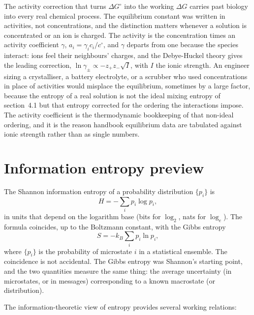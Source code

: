 The activity correction that turns $\Delta G^\circ$ into the working $\Delta G$
carries past biology into every real chemical process. The equilibrium constant
was written in activities, not concentrations, and the distinction matters
whenever a solution is concentrated or an ion is charged. The activity is the
concentration times an activity coefficient $\gamma$, $a_i = \gamma_i c_i/c^\circ$,
and $\gamma$ departs from one because the species interact: ions feel their
neighbours' charges, and the Debye-Huckel theory gives the leading correction,
$\ln\gamma_\pm \propto -z_+ z_- \sqrt{I}$, with $I$ the ionic strength. An
engineer sizing a crystalliser, a battery electrolyte, or a scrubber who used
concentrations in place of activities would misplace the equilibrium, sometimes
by a large factor, because the entropy of a real solution is not the ideal
mixing entropy of section~4.1 but that entropy corrected for the ordering the
interactions impose. The activity coefficient is the thermodynamic bookkeeping of
that non-ideal ordering, and it is the reason handbook equilibrium data are
tabulated against ionic strength rather than as single numbers.

\section{Information entropy preview}

The Shannon information entropy of a probability distribution $\{p_i\}$
is \cite{paper:shannon1948}
\[
H = -\sum_i p_i \log p_i,
\]
in units that depend on the logarithm base (bits for $\log_2$, nats
for $\log_e$). The formula coincides, up to the Boltzmann constant,
with the Gibbs entropy
\[
S = -k_B \sum_i p_i \ln p_i,
\]
where $\{p_i\}$ is the probability of microstate $i$ in a
statistical ensemble. The coincidence is not accidental. The Gibbs
entropy was Shannon's starting point, and the two quantities measure
the same thing: the average uncertainty (in microstates, or in
messages) corresponding to a known macrostate (or distribution).

The information-theoretic view of entropy provides several working
relations:

